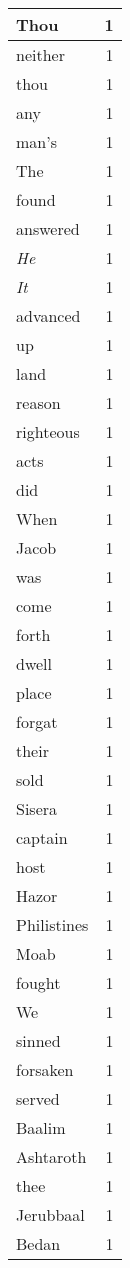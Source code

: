 \begin{center}
\begin{longtable}{l|r}
Thou & 1 \\ \hline
neither & 1 \\ \hline
thou & 1 \\ \hline
any & 1 \\ \hline
man's & 1 \\ \hline
The & 1 \\ \hline
found & 1 \\ \hline
answered & 1 \\ \hline
\emph{He} & 1 \\ \hline
\emph{It} & 1 \\ \hline
advanced & 1 \\ \hline
up & 1 \\ \hline
land & 1 \\ \hline
reason & 1 \\ \hline
righteous & 1 \\ \hline
acts & 1 \\ \hline
did & 1 \\ \hline
When & 1 \\ \hline
Jacob & 1 \\ \hline
was & 1 \\ \hline
come & 1 \\ \hline
forth & 1 \\ \hline
dwell & 1 \\ \hline
place & 1 \\ \hline
forgat & 1 \\ \hline
their & 1 \\ \hline
sold & 1 \\ \hline
Sisera & 1 \\ \hline
captain & 1 \\ \hline
host & 1 \\ \hline
Hazor & 1 \\ \hline
Philistines & 1 \\ \hline
Moab & 1 \\ \hline
fought & 1 \\ \hline
We & 1 \\ \hline
sinned & 1 \\ \hline
forsaken & 1 \\ \hline
served & 1 \\ \hline
Baalim & 1 \\ \hline
Ashtaroth & 1 \\ \hline
thee & 1 \\ \hline
Jerubbaal & 1 \\ \hline
Bedan & 1 \\ \hline

\end{longtable}
\end{center}
